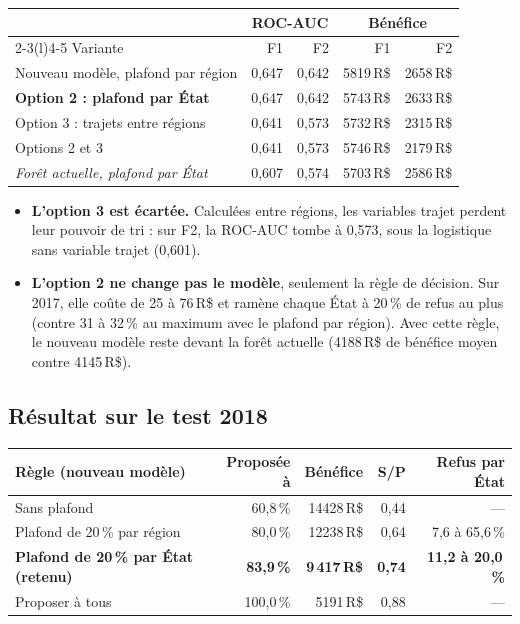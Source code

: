 \documentclass[11pt,a4paper]{article}
\newcommand{\RS}{\,R\$}
\begin{document}
\begin{center}
\begin{tabular}{@{}lrrrr@{}}
\toprule
& \multicolumn{2}{c}{ROC-AUC} & \multicolumn{2}{c}{Bénéfice} \\
\cmidrule(lr){2-3}\cmidrule(l){4-5}
Variante & F1 & F2 & F1 & F2 \\
\midrule
Nouveau modèle, plafond par région & 0,647 & 0,642 & \num{5819}\RS{} & \num{2658}\RS{} \\
\textbf{Option 2 : plafond par État} & 0,647 & 0,642 & \num{5743}\RS{} & \num{2633}\RS{} \\
Option 3 : trajets entre régions & 0,641 & \textcolor{sinistre}{0,573} & \num{5732}\RS{} & \textcolor{sinistre}{\num{2315}\RS{}} \\
Options 2 et 3 & 0,641 & 0,573 & \num{5746}\RS{} & \num{2179}\RS{} \\
\midrule
\emph{Forêt actuelle, plafond par État} & 0,607 & 0,574 & \num{5703}\RS{} & \num{2586}\RS{} \\
\bottomrule
\end{tabular}
\end{center}

\begin{itemize}
  \item \textbf{L'option 3 est écartée.} Calculées entre régions, les variables trajet perdent
        leur pouvoir de tri : sur F2, la ROC-AUC tombe à 0,573, sous la logistique sans variable
        trajet (0,601).
  \item \textbf{L'option 2 ne change pas le modèle}, seulement la règle de décision. Sur 2017,
        elle coûte de 25 à 76\RS{} et ramène chaque État à 20\,\% de refus au plus (contre 31
        à 32\,\% au maximum avec le plafond par région). Avec cette règle, le nouveau modèle reste
        devant la forêt actuelle (\num{4188}\RS{} de bénéfice moyen contre \num{4145}\RS{}).
\end{itemize}

\subsection{Résultat sur le test 2018}

\begin{center}
\begin{tabular}{@{}lrrrr@{}}
\toprule
Règle (nouveau modèle) & Proposée à & Bénéfice & S/P & Refus par État \\
\midrule
Sans plafond & 60,8\,\% & \num{14428}\RS{} & 0,44 & --- \\
Plafond de 20\,\% par région & 80,0\,\% & \num{12238}\RS{} & 0,64 & 7,6 à 65,6\,\% \\
\textbf{Plafond de 20\,\% par État (retenu)} & \textbf{83,9\,\%} & \textbf{9\,417\RS{}} & \textbf{0,74} & \textbf{11,2 à 20,0\,\%} \\
\midrule
Proposer à tous & 100,0\,\% & \num{5191}\RS{} & 0,88 & --- \\
\bottomrule
\end{tabular}
\end{center}
\end{document}

